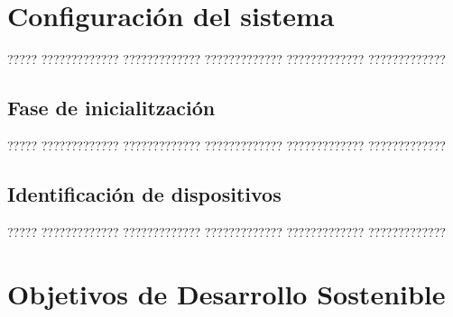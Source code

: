 \documentclass[11pt,spanish,listoffigures,listoftables]{tfgetsinf}
\begin{document}
\cleardoublepage


\APPENDIX





\chapter{Configuración del sistema}

????? ????????????? ????????????? ????????????? ????????????? ?????????????

\section{Fase de inicialitzación}

????? ????????????? ????????????? ????????????? ????????????? ?????????????

\section{Identificación de dispositivos}

????? ????????????? ????????????? ????????????? ????????????? ?????????????



\chapter{Objetivos de Desarrollo Sostenible}
\end{document}
